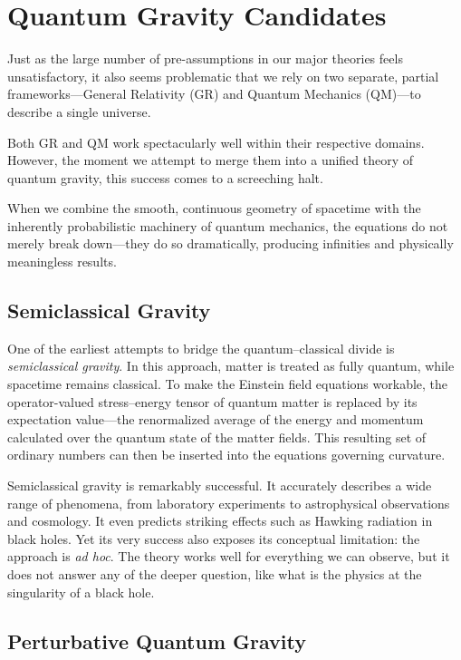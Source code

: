 \chapter{Quantum Gravity Candidates}

Just as the large number of pre-assumptions in our major theories feels unsatisfactory, it also seems problematic that we rely on two separate, partial frameworks—General Relativity (GR) and Quantum Mechanics (QM)—to describe a single universe.

Both GR and QM work spectacularly well within their respective domains. However, the moment we attempt to merge them into a unified theory of quantum gravity, this success comes to a screeching halt.

When we combine the smooth, continuous geometry of spacetime with the inherently probabilistic machinery of quantum mechanics, the equations do not merely break down—they do so dramatically, producing infinities and physically meaningless results.


\section{Semiclassical Gravity}

One of the earliest attempts to bridge the quantum--classical divide is \emph{semiclassical gravity}. In this approach, matter is treated as fully quantum, while spacetime remains classical. To make the Einstein field equations workable, the operator-valued stress--energy tensor of quantum matter is replaced by its expectation value—the renormalized average of the energy and momentum calculated over the quantum state of the matter fields. This resulting set of ordinary numbers can then be inserted into the equations governing curvature.

Semiclassical gravity is remarkably successful. It accurately describes a wide range of phenomena, from laboratory experiments to astrophysical observations and cosmology. It even predicts striking effects such as Hawking radiation in black holes. Yet its very success also exposes its conceptual limitation: the approach is \emph{ad hoc}.
The theory works well for everything we can observe, but it does not answer any of the deeper question, like what is the physics at the singularity of a black hole.

\section{Perturbative Quantum Gravity}

